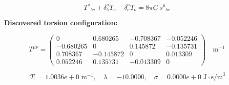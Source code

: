 
\begin{equation}
  T^a{}_{bc} + \delta^a_b T_c - \delta^a_c T_b = 8\pi G \, s^a{}_{bc}
\end{equation}

\textbf{Discovered torsion configuration:}

\begin{equation}
  T^{\mu\nu} = \begin{pmatrix}
    0 & 0.680265 & -0.708367 & -0.052246 \\
    -0.680265 & 0 & 0.145872 & -0.135731 \\
    0.708367 & -0.145872 & 0 & 0.013309 \\
    0.052246 & 0.135731 & -0.013309 & 0
  \end{pmatrix} \quad \text{m}^{-1}
\end{equation}

\begin{equation}
  |T| = 1.0036e+0 \text{ m}^{-1}, \quad
  \lambda = -10.0000, \quad
  \sigma = 0.0000e+0 \text{ J}\cdot\text{s/m}^3
\end{equation}